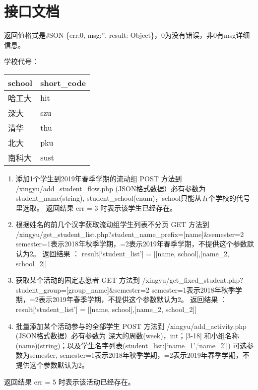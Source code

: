\documentclass[]{article}
\date{}
\begin{document}
\hypertarget{ux63a5ux53e3ux6587ux6863}{%
\section{接口文档}\label{ux63a5ux53e3ux6587ux6863}}

返回值格式是JSON \{err:0, msg:'', result:
Object\}，0为没有错误，非0有msg详细信息。

学校代号：

\begin{longtable}[]{@{}ll@{}}
\toprule
school & short\_code\tabularnewline
\midrule
\endhead
哈工大 & hit\tabularnewline
深大 & szu\tabularnewline
清华 & thu\tabularnewline
北大 & pku\tabularnewline
南科大 & sust\tabularnewline
\bottomrule
\end{longtable}

\begin{enumerate}
\def\labelenumi{\arabic{enumi}.}
\item
  添加1个学生到2019年春季学期的流动组 POST 方法到
  /xingyu/add\_student\_flow.php (JSON格式数据）必有参数为
  student\_name(string),
  student\_school(enum)，school只能从五个学校的代号里选取。 返回结果 err
  = 3 时表示该学生已经存在。
\item
  根据姓名的前几个汉字获取流动组学生列表不分页 GET 方法到
  /xingyu/get\_student\_list.php?student\_name\_prefix={[}name{]}\&semester=2
  semester=1表示2018年秋季学期，=2表示2019年春季学期，不提供这个参数默认为2。
  返回结果 ： result{[}`student\_list'{]} = {[}{[}name,
  school{]},{[}name\_2, school\_2{]}{]}
\item
  获取某个活动的固定志愿者 GET 方法到
  /xingyu/get\_fixed\_student.php?student\_group={[}group\_name{]}\&semester=2
  semester=1表示2018年秋季学期，=2表示2019年春季学期，不提供这个参数默认为2。
  返回结果 ： result{[}`student\_list'{]} = {[}{[}name,
  school{]},{[}name\_2, school\_2{]}{]}
\item
  批量添加某个活动参与的全部学生 POST 方法到 /xingyu/add\_activity.php
  (JSON格式数据）必有参数为 深大的周数(week)，int；{[}3-18{]}
  和小组名称(name)(string)；以及学生名字列表(student\_list:{[}`name\_1',`name\_2'{]})
  可选参数为semester,
  semester=1表示2018年秋季学期，=2表示2019年春季学期，不提供这个参数默认为2。
\end{enumerate}

返回结果 err = 5 时表示该活动已经存在。
\end{document}
